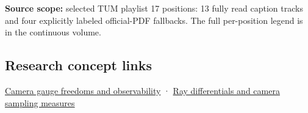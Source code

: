 \textbf{Source scope:} selected TUM playlist 17 positions: 13 fully read caption tracks and four explicitly labeled official-PDF fallbacks. The full per-position legend is in {the continuous volume}.

\subsection{Research concept links}\label{appendix-a2b71a18f5a2-research-concept-links}

\hyperref[appendix-113f0267e5f4]{Camera gauge freedoms and observability} · \hyperref[appendix-8c40fad29462]{Ray differentials and camera sampling measures}

